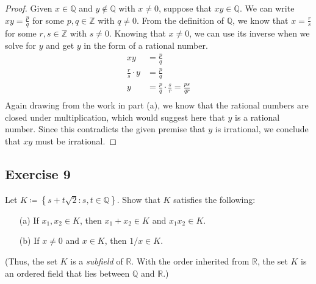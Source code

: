 \documentclass[12pt]{article}
\begin{document}
\begin{itemize}
\begin{proof}
Given $x \in \mathbb{Q}$ and $y \notin \mathbb{Q}$ with $x \neq 0$, suppose that $xy \in \mathbb{Q}$. We can write $xy = \frac{p}{q}$ for some $p, q \in \mathbb{Z}$ with $q \neq 0$. From the definition of $\mathbb{Q}$, we know that $x = \frac{r}{s}$ for some $r, s \in \mathbb{Z}$ with $s \neq 0$. Knowing that $x \neq 0$, we can use its inverse when we solve for $y$ and get $y$ in the form of a rational number.
\begin{align*}
xy &= \frac{p}{q} \\
\frac{r}{s} \cdot y &= \frac{p}{q} \\
y &= \frac{p}{q} \cdot \frac{s}{r} = \frac{ps}{qr} \\
\end{align*}
Again drawing from the work in part (a), we know that the rational numbers are closed under multiplication, which would suggest here that $y$ is a rational number. Since this contradicts the given premise that $y$ is irrational, we conclude that $xy$ must be irrational.
\end{proof}
\end{itemize}

\subsection*{Exercise 9}
Let $K \coloneqq \left\{s + t\sqrt{2} : s, t \in \mathbb{Q}\right\}$. Show that $K$ satisfies the following:
\begin{itemize}
\item[(a)] If $x_1, x_2 \in K$, then $x_1 + x_2 \in K$ and $x_1x_2 \in K$.
\item[(b)] If $x \neq 0$ and $x \in K$, then $1/x \in K$.
\end{itemize}
(Thus, the set $K$ is a {\it subfield} of $\mathbb{R}$. With the order inherited from $\mathbb{R}$, the set $K$ is an ordered field that lies between $\mathbb{Q}$ and $\mathbb{R}$.)
\end{document}
